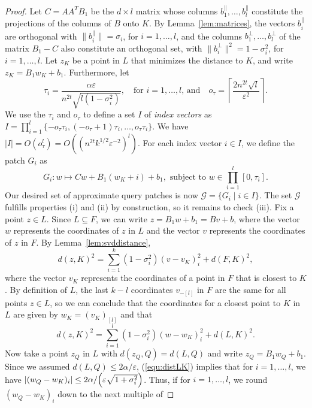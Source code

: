 \documentclass[a4paper,11pt]{paper}
\newcommand{\eps}{\varepsilon}
\begin{document}
\begin{proof}
Let $C = AA^TB_1$ be the $d \times l$ matrix
whose columns $b_1^\parallel, \dots, b_l^\parallel$ constitute
the projections of the columns of $B$ onto $K$.
By Lemma~\ref{lem:matrices},
the vectors $b_i^\parallel$ are  orthogonal with
$\|b_i^\parallel\| = \sigma_i$, for
$i = 1, \dots, l$, and the columns
$b_1^\perp, \dots, b_l^\perp$
of the matrix $B_1 - C$ also constitute an orthogonal set,
with $\|b_i^\perp\|^2 = 1-\sigma_i^2$,
for $i = 1, \dots, l$. Let $z_K$
be a point in $L$ that minimizes the distance to $K$, and write
$z_K = B_1w_K + b_1$.  Furthermore, let
\[
  \tau_i =
  \frac{\alpha\eps}{n^{2t}\sqrt{l(1-\sigma_i^2)}},
  \quad
  \text{for $i = 1, \dots, l$, and}
  \quad
  o_{\tau} = \left\lceil \frac{2 n^{2t} \sqrt{l}}{\eps^{2}}\right\rceil.
\]
We use the $\tau_i$ and $o_\tau$ to define a set $I$ of
\emph{index vectors} as
$
  I = \prod_{i=1}^{l}
  \{-o_\tau\tau_i, (-o_\tau + 1)\tau_i, \dots,
    o_\tau \tau_i\}
$.
We have $|I| = O(o_\tau^l) = O((n^{2t}k^{1/2}\eps^{-2})^l)$.
For each index vector $i \in I$, we define the patch $G_i$ as
\[
  G_i: w \mapsto Cw + B_1(w_K + i)
  + b_1, \text{ subject to } w \in \prod_{i=1}^{l}
  \left[0,  \tau_i\right].
\]
Our desired set of approximate query patches is now
$\mathcal{G} = \{G_i \mid i \in I\}$.
The set $\mathcal{G}$ fulfills
properties (i) and (ii) by construction, so it remains to check
(iii). Fix a point $z \in L$. Since $L \subseteq F$, we can
write $z =  B_1w + b_1 = Bv + b$, where the vector $w$
represents the coordinates of $z$ in $L$ and the vector $v$
represents the coordinates of $z$ in $F$.
By Lemma~\ref{lem:svddistance},
\[
  d(z, K)^2 = \sum_{i=1}^k (1-\sigma_i^2)(v - v_K)_i^2
           + d(F, K)^2,
\]
where the vector $v_K$ represents the coordinates of a point in
$F$ that is closest to $K$. By definition of $L$, the last
$k-l$ coordinates $v_{-[l]}$ in $F$  are the same for all points
$z \in L$, so we can conclude that the coordinates for
a closest point to $K$ in $L$ are given by
$w_K = (v_K)_{[l]}$ and that
\begin{equation}\label{equ:distLK}
  d(z, K)^2 = \sum_{i=1}^l (1-\sigma_i^2)(w - w_K)_i^2
           + d(L, K)^2.
\end{equation}
Now take a point $z_Q$ in $L$ with $d(z_Q, Q) = d(L, Q)$ and
write $z_Q = B_1w_Q + b_1$.
Since we assumed $d(L, Q) \leq 2\alpha/\eps$, (\ref{equ:distLK})
implies that for $i = 1, \dots, l$, we have
$|(w_Q - w_K)_i| \leq 2\alpha/\Bigl(\eps\sqrt{1 + \sigma_i^2}\Bigr)$.
Thus, if for $i = 1, \dots, l$, we round
$(w_Q - w_K)_i$ down to the next multiple of

\end{proof}
\end{document}
